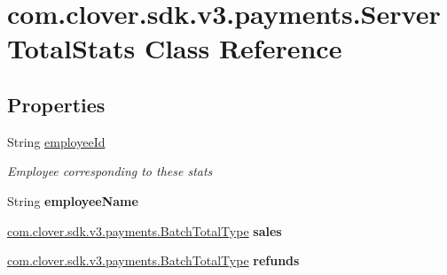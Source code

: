 \hypertarget{classcom_1_1clover_1_1sdk_1_1v3_1_1payments_1_1_server_total_stats}{}\section{com.\+clover.\+sdk.\+v3.\+payments.\+Server\+Total\+Stats Class Reference}
\label{classcom_1_1clover_1_1sdk_1_1v3_1_1payments_1_1_server_total_stats}
\subsection*{Properties}
\begin{DoxyCompactItemize}
\item 
String \hyperlink{classcom_1_1clover_1_1sdk_1_1v3_1_1payments_1_1_server_total_stats_a9f0cf0d1a1508785839473b3d10892d5}{employee\+Id}
\begin{DoxyCompactList}\small\item\em Employee corresponding to these stats \end{DoxyCompactList}\item 
\mbox{\label{classcom_1_1clover_1_1sdk_1_1v3_1_1payments_1_1_server_total_stats_aa0d23406586cebb1b2a8f8c2357f1a21}} 
String {\bfseries employee\+Name}
\item 
\mbox{\label{classcom_1_1clover_1_1sdk_1_1v3_1_1payments_1_1_server_total_stats_a8122a7c345b18a981dcd470164f0cec9}} 
\hyperlink{classcom_1_1clover_1_1sdk_1_1v3_1_1payments_1_1_batch_total_type}{com.\+clover.\+sdk.\+v3.\+payments.\+Batch\+Total\+Type} {\bfseries sales}
\item 
\mbox{\label{classcom_1_1clover_1_1sdk_1_1v3_1_1payments_1_1_server_total_stats_a0e86269a817d7628f095d1ec2acd460c}} 
\hyperlink{classcom_1_1clover_1_1sdk_1_1v3_1_1payments_1_1_batch_total_type}{com.\+clover.\+sdk.\+v3.\+payments.\+Batch\+Total\+Type} {\bfseries refunds}

\end{DoxyCompactItemize}
